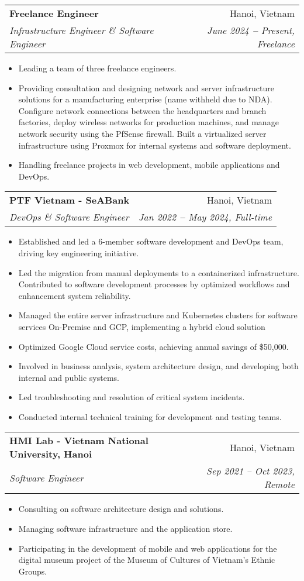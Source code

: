 \documentclass[letterpaper,11pt]{article}
\makeatletter
\newcommand{\resumeItem}[1]{
  \item\small{
    {#1 \vspace{-2pt}}
  }
}
\newcommand{\resumeSubheading}[4]{
  \vspace{-2pt}\item
    \begin{tabular*}{0.97\textwidth}[t]{l@{\extracolsep{\fill}}r}
      \textbf{#1} & #2 \\
      \textit{\small#3} & \textit{\small #4} \\
    \end{tabular*}\vspace{-7pt}
}
\newcommand{\resumeItemListStart}{\begin{itemize}}
\newcommand{\resumeItemListEnd}{\end{itemize}\vspace{-5pt}}
\makeatother
\begin{document}
    \resumeSubheading
      {Freelance Engineer}{Hanoi, Vietnam}
      {Infrastructure Engineer \& Software Engineer}{June 2024 \textbf{--} Present, Freelance}
        \resumeItemListStart
            \resumeItem{Leading a team of three freelance engineers.}
            \resumeItem{Providing consultation and designing network and server infrastructure solutions for a manufacturing enterprise (name withheld due to NDA). Configure network connections between the headquarters and branch factories, deploy wireless networks for production machines, and manage network security using the PfSense firewall. Built a virtualized server infrastructure using Proxmox for internal systems and software deployment.}
            \resumeItem{Handling freelance projects in web development, mobile applications and DevOps.}
        \resumeItemListEnd

    \resumeSubheading
      {PTF Vietnam - SeABank}{Hanoi, Vietnam}
      {DevOps \& Software Engineer}{Jan 2022 \textbf{--} May 2024, Full-time}
        \resumeItemListStart
            \resumeItem{Established and led a 6-member software development and DevOps team, driving key engineering initiative.}
            \resumeItem{Led the migration from manual deployments to a containerized infrastructure. Contributed to software development processes by optimized workflows and enhancement system reliability.}
            \resumeItem{Managed the entire server infrastructure and Kubernetes clusters for software services On-Premise and GCP, implementing a hybrid cloud solution}
            \resumeItem{Optimized Google Cloud service costs, achieving annual savings of \$50,000.}
            \resumeItem{Involved in business analysis, system architecture design, and developing both internal and public systems.}
            \resumeItem{Led troubleshooting and resolution of critical system incidents.}
            \resumeItem{Conducted internal technical training for development and testing teams.}
        \resumeItemListEnd

    \resumeSubheading
      {HMI Lab - Vietnam National University, Hanoi}{Hanoi, Vietnam}
      {Software Engineer}{Sep 2021 -- Oct 2023, Remote}
        \resumeItemListStart
            \resumeItem{Consulting on software architecture design and solutions.}
            \resumeItem{Managing software infrastructure and the application store.}
            \resumeItem{Participating in the development of mobile and web applications for the digital museum project of the Museum of Cultures of Vietnam's Ethnic Groups.}
        \resumeItemListEnd
\end{document}

